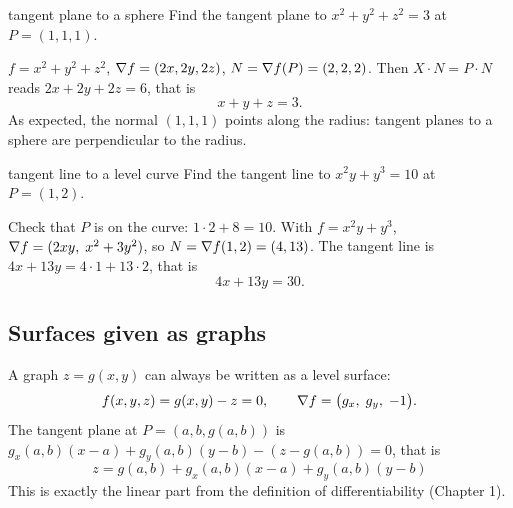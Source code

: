 \begin{example}{tangent plane to a sphere}
Find the tangent plane to $x^2+y^2+z^2=3$ at $P=(1,1,1)$.

$f=x^2+y^2+z^2$, $\nabla f=(2x,2y,2z)$, $N=\nabla f(P)=(2,2,2)$. Then $X\cdot N=P\cdot N$
reads $2x+2y+2z=6$, that is
\[ x+y+z=3 . \]
As expected, the normal $(1,1,1)$ points along the radius: tangent planes to a sphere are
perpendicular to the radius.
\end{example}

\begin{example}{tangent line to a level curve}
Find the tangent line to $x^2y+y^3=10$ at $P=(1,2)$.

Check that $P$ is on the curve: $1\cdot2+8=10$. With $f=x^2y+y^3$,
$\nabla f=(2xy,\;x^2+3y^2)$, so $N=\nabla f(1,2)=(4,13)$. The tangent line is
$4x+13y=4\cdot1+13\cdot2$, that is
\[ 4x+13y=30 . \]
\end{example}

\begin{center}
\end{center}

\subsection{Surfaces given as graphs}

A graph $z=g(x,y)$ can always be written as a level surface:
\[ f(x,y,z)=g(x,y)-z=0,\qquad \nabla f=\big(g_x,\;g_y,\;-1\big). \]
The tangent plane at $P=(a,b,g(a,b))$ is $g_x(a,b)(x-a)+g_y(a,b)(y-b)-(z-g(a,b))=0$, that is
\[
\boxed{\,z=g(a,b)+g_x(a,b)(x-a)+g_y(a,b)(y-b)\,}
\]
This is exactly the linear part from the definition of differentiability (Chapter 1).

